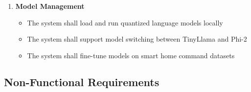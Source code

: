 \documentclass[12pt]{article}
\begin{document}
\begin{enumerate}[label=FR-\arabic*]
\item \textbf{Model Management}
    \begin{itemize}
    \item The system shall load and run quantized language models locally
    \item The system shall support model switching between TinyLlama and Phi-2
    \item The system shall fine-tune models on smart home command datasets
    \end{itemize}
\end{enumerate}

\subsection{Non-Functional Requirements}
\end{document}
